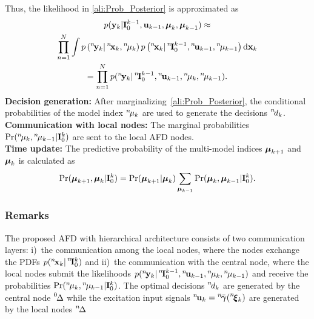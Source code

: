\documentclass[conference,letterpaper]{IEEEtran}
\def\zeroth{\prescript{0\!}{}}
\def\nth{\prescript{n\!}{}}
\begin{document}
Thus, the likelihood in \eqref{ali:Prob_Posterior} is approximated as
\begin{multline} \label{ali:likelihoodApprox}
	p(\bfy_{k}|\bfI_0^{k-1},\bfu_{k-1},\bfmu_{k},\bfmu_{k-1}) \approx\\
	\prod_{n=1}^{N} \int p\left( \nth{\bfy}_{k}|\nth{\bfx}_{k},\nth{\mu}_{k} \right) p\left( \nth{\bfx}_{k} | \nth{\bfI}_{0}^{k-1},\nth{\bfu}_{k-1},\nth{\mu}_{k-1} \right) \mathrm{d}\bfx_{k}\\
	=\prod_{n=1}^{N} p(\nth{\bfy}_k\vert\nth{\bfI}_0^{k-1},\nth{\bfu}_{k-1},\nth{\mu}_k,\nth{\mu}_{k-1}).
\end{multline}
\textbf{Decision generation:} After marginalizing~\eqref{ali:Prob_Posterior}, the conditional probabilities of the model index $\nth{\mu}_{k}$ are used to generate the decisions $\nth{d}_{k}$.\\
\textbf{Communication with local nodes:} The marginal probabilities $\Pr(\nth{\mu}_k,\nth{\mu}_{k-1}|\bfI_0^k)$ are sent to the local AFD nodes.\\
\textbf{Time update:} The predictive probability of the multi-model indices $\boldsymbol{\mu}_{k+1}$ and $\boldsymbol{\mu}_k$ is calculated as 
\begin{align*}
	\Pr(\boldsymbol{\mu}_{k+1},\boldsymbol{\mu}_k|\mathbf{I}_0^k) = \Pr(\boldsymbol{\mu}_{k+1}|\boldsymbol{\mu}_k) \sum_{\boldsymbol{\mu}_{k-1}} \Pr(\boldsymbol{\mu}_k,\boldsymbol{\mu}_{k-1}|\mathbf{I}_0^k).
\end{align*}
\subsubsection{Remarks}\label{sec:remarks}
The proposed AFD with hierarchical architecture consists of two communication layers: i)~the communication among the local nodes, where the nodes exchange the PDFs $p(\nth{\bfx}_k\vert\nth{\bfI}^k_0)$ and ii)~the communication with the central node, where the local nodes submit the likelihoods $p(\nth{\bfy}_k\vert\nth{\bfI}_0^{k-1},\nth{\bfu}_{k-1},\nth{\mu}_k,\nth{\mu}_{k-1})$ and receive the probabilities $\Pr(\nth{\mu}_k,\nth{\mu}_{k-1}|\bfI_0^k)$.
  The optimal decisions $\nth{d}_{k}$ are generated by the central node $\zeroth{\Delta}$ while the excitation input signals $\nth{\bfu}_{k}=\nth{\bar{\bfgamma}}(\nth{\bfxi}_k)$ are generated by the local nodes $\nth{\Delta}$  
\end{document}
